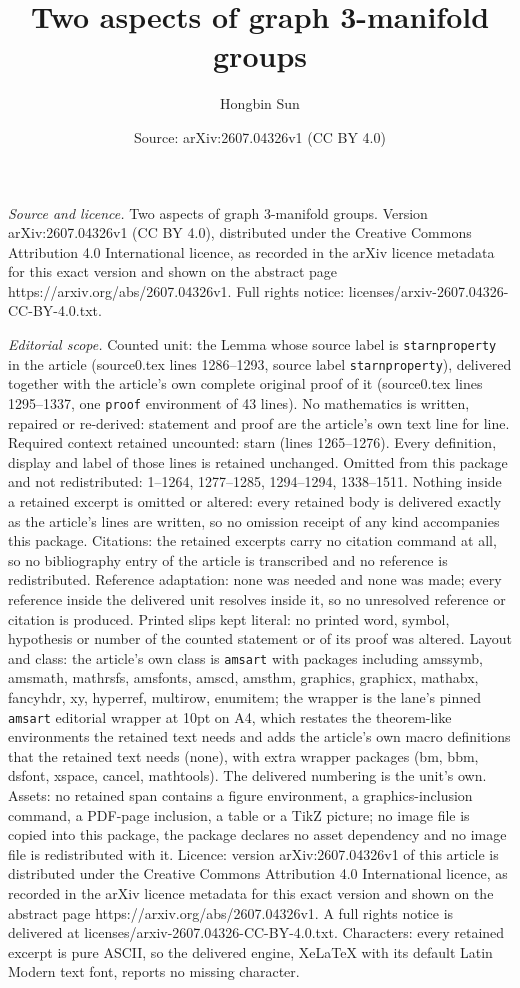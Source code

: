 \documentclass[10pt,a4paper]{amsart}
\title[Two aspects of graph 3-manifold groups]{Two aspects of graph 3-manifold groups}
\author{Hongbin Sun}
\date{Source: arXiv:2607.04326v1 (CC BY 4.0)}
\begin{document}
\maketitle

\noindent\emph{Source and licence.} Two aspects of graph 3-manifold groups. Version arXiv:2607.04326v1 (CC BY 4.0), distributed under the Creative Commons Attribution 4.0 International licence, as recorded in the arXiv licence metadata for this exact version and shown on the abstract page https://arxiv.org/abs/2607.04326v1. Full rights notice: licenses/arxiv-2607.04326-CC-BY-4.0.txt.\par\smallskip

\noindent\textit{Editorial scope.} Counted unit: the Lemma whose source label is \texttt{starnproperty} in the article (source0.tex lines 1286--1293, source label \texttt{starnproperty}), delivered together with the article's own complete original proof of it (source0.tex lines 1295--1337, one \texttt{proof} environment of 43 lines). No mathematics is written, repaired or re-derived: statement and proof are the article's own text line for line. Required context retained uncounted: starn (lines 1265--1276). Every definition, display and label of those lines is retained unchanged. Omitted from this package and not redistributed: 1--1264, 1277--1285, 1294--1294, 1338--1511. Nothing inside a retained excerpt is omitted or altered: every retained body is delivered exactly as the article's lines are written, so no omission receipt of any kind accompanies this package. Citations: the retained excerpts carry no citation command at all, so no bibliography entry of the article is transcribed and no reference is redistributed. Reference adaptation: none was needed and none was made; every reference inside the delivered unit resolves inside it, so no unresolved reference or citation is produced. Printed slips kept literal: no printed word, symbol, hypothesis or number of the counted statement or of its proof was altered. Layout and class: the article's own class is \texttt{amsart} with packages including amssymb, amsmath, mathrsfs, amsfonts, amscd, amsthm, graphics, graphicx, mathabx, fancyhdr, xy, hyperref, multirow, enumitem; the wrapper is the lane's pinned \texttt{amsart} editorial wrapper at 10pt on A4, which restates the theorem-like environments the retained text needs and adds the article's own macro definitions that the retained text needs (none), with extra wrapper packages (bm, bbm, dsfont, xspace, cancel, mathtools). The delivered numbering is the unit's own. Assets: no retained span contains a figure environment, a graphics-inclusion command, a PDF-page inclusion, a table or a TikZ picture; no image file is copied into this package, the package declares no asset dependency and no image file is redistributed with it. Licence: version arXiv:2607.04326v1 of this article is distributed under the Creative Commons Attribution 4.0 International licence, as recorded in the arXiv licence metadata for this exact version and shown on the abstract page https://arxiv.org/abs/2607.04326v1. A full rights notice is delivered at licenses/arxiv-2607.04326-CC-BY-4.0.txt. Characters: every retained excerpt is pure ASCII, so the delivered engine, XeLaTeX with its default Latin Modern text font, reports no missing character.
\end{document}
